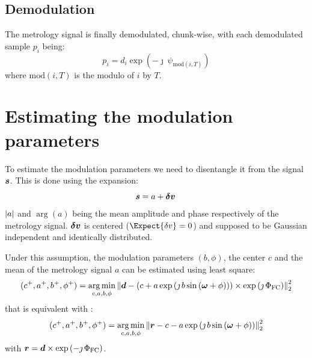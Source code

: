 \documentclass[a4paper,11pt,twoside]{scrartcl}
\begin{document}
\subsection{Demodulation}
The metrology signal is finally demodulated, chunk-wise, with each demodulated sample $p_i$  being:
\begin{equation}
   p_i = d_i  \exp\left(- \jmath \,\psi_{\textrm{mod}(i,T)} \right) 
\end{equation}
where $\textrm{mod}(i,T)$ is the modulo of $i$ by $T$.

\section{ Estimating the modulation parameters}

To estimate the modulation parameters we need to disentangle it from the signal  $\boldsymbol{s}$. This is done using the expansion:
\begin{equation}
    \boldsymbol{s} = a  + \boldsymbol{\delta v}\,
\end{equation}
$\vert a\vert$  and $\arg{(a)}$ being the  mean amplitude and phase respectively of the metrology signal.  $ \boldsymbol{\delta v}$ is centered ($\Expect{\delta v}= 0$)  and supposed to be Gaussian independent and identically distributed.

Under this assumption, the modulation parameters $( b, \phi)$, the center $c$ and the mean of the metrology signal $a$ can be estimated using least square:
\begin{equation}
    (c^+, a^+, b^+, \phi^+) = \argmin_{c,a,b,\phi} \Norm{\V{d} -  \left(c + a \exp\left( \jmath \, b \sin\left( \V{\omega} + \phi\right)\right)\right)\times\exp\left(\jmath\,\Phi_\textrm{FC}\right) }_2^2
\end{equation}
that is equivalent with : 
\begin{equation}
    (c^+, a^+, b^+, \phi^+) = \argmin_{c,a,b,\phi} \Norm{\V{r} -  c - a \exp\left( \jmath \, b \sin\left( \V{\omega} + \phi\right)\right) }_2^2\label{eq:r}
\end{equation}
with $\boldsymbol{r} =\boldsymbol{d}\times\exp\left(-\jmath\,\Phi_\textrm{FC}\right)$.
\end{document}
